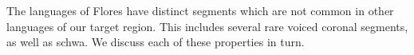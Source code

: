 The languages of Flores have distinct segments which are not common
in other languages of our target region.
This includes several rare voiced coronal segments,
as well as schwa.
We discuss each of these properties in turn.